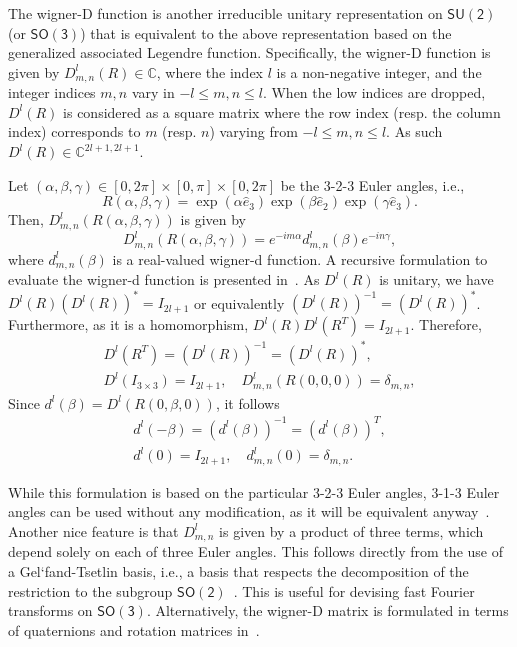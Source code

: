 \documentclass{ieeetran}
\newcommand{\SO}{\ensuremath{\mathsf{SO(3)}}}
\newcommand{\Cp}{\ensuremath{\mathbb{C}}}
\begin{document}
The wigner-D function is another irreducible unitary representation on $\mathsf{SU(2)}$ (or $\SO$) that is equivalent to the above representation based on the generalized associated Legendre function. Specifically, the wigner-D function is given by $D^l_{m,n}(R)\in\Cp$, where the index $l$ is a non-negative integer, and the integer indices $m,n$ vary in $-l\leq m,n \leq l$. When the low indices are dropped, $D^l(R)$ is considered as a square matrix where the row index (resp. the column index) corresponds to $m$ (resp. $n$) varying from $-l\leq m,n \leq l$. As such $D^l(R)\in\Cp^{2l+1,2l+1}$.

Let $(\alpha,\beta,\gamma)\in[0,2\pi]\times[0,\pi]\times[0,2\pi]$ be the 3-2-3 Euler angles, i.e., 
\[
R(\alpha,\beta,\gamma)=\exp(\alpha\hat e_3)\exp(\beta\hat e_2)\exp(\gamma\hat e_3). 
\]
Then, $D^l_{m,n}(R(\alpha,\beta,\gamma))$ is given by
\[
D^l_{m,n}(R(\alpha,\beta,\gamma)) = e^{-i m\alpha} d^l_{m,n}(\beta) e^{-i n\gamma},
\]
where $d^l_{m,n}(\beta)$ is a real-valued wigner-d function. A recursive formulation to evaluate the wigner-d function is presented in~\cite{BlaFloJMS97}. As $D^l(R)$ is unitary, we have $D^l(R)(D^{l}(R))^*=I_{2l+1}$ or equivalently $(D^l(R))^{-1}=(D^l(R))^*$. Furthermore, as it is a homomorphism, $D^l(R)D^l(R^T)=I_{2l+1}$. Therefore,
\begin{gather*}
D^l(R^T) = (D^l(R))^{-1} = (D^l(R))^*,\\
D^l(I_{3\times 3}) =I_{2l+1},\quad
D^l_{m,n}(R(0,0,0))=\delta_{m,n},
\end{gather*}
Since $d^l(\beta)=D^l(R(0,\beta,0))$, it follows
\begin{gather*}
d^l(-\beta) = (d^l(\beta))^{-1} = (d^l(\beta))^T,\\
d^l(0)=I_{2l+1},\quad d^l_{m,n}(0)=\delta_{m,n}.
\end{gather*}


While this formulation is based on the particular 3-2-3 Euler angles, 3-1-3 Euler angles can be used without any modification, as it will be equivalent anyway~\cite{ChiKya01}. Another nice feature is that $D^l_{m,n}$ is given by a product of three terms, which depend solely on each of three Euler angles. This follows directly from the use of a Gel`fand-Tsetlin basis, i.e., a basis that respects the decomposition of the restriction to the subgroup $\mathsf{SO(2)}$~\cite{MasRocGC97}. This is useful for devising fast Fourier transforms on $\SO$. Alternatively, the wigner-D matrix is formulated in terms of quaternions and rotation matrices in~\cite{LynStoMS89}.
\end{document}
